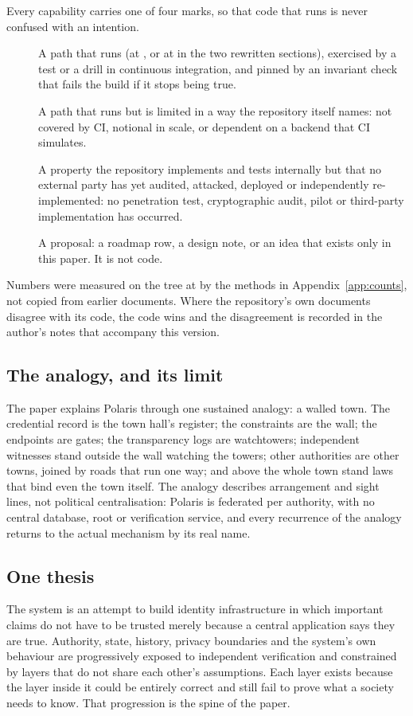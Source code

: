 Every capability carries one of four marks, so that code that runs is never confused with an
intention.

\begin{description}
  \item[\sImpl] A path that runs (at , or at  in the two rewritten
    sections), exercised by a test or a drill in continuous
    integration, and pinned by an invariant check that fails the build if it stops being true.
  \item[\sExp] A path that runs but is limited in a way the repository itself names: not covered by
    CI, notional in scale, or dependent on a backend that CI simulates.
  \item[\sExt] A property the repository implements and tests internally but that no external
    party has yet audited, attacked, deployed or independently re-implemented: no penetration
    test, cryptographic audit, pilot or third-party implementation has occurred.
  \item[\sFut] A proposal: a roadmap row, a design note, or an idea that exists only in this paper.
    It is not code.
\end{description}

Numbers were measured on the tree at  by the methods in Appendix~\ref{app:counts},
not copied from earlier documents. Where the repository's own documents disagree with its code, the
code wins and the disagreement is recorded in the author's notes that accompany this version.

\subsection*{The analogy, and its limit}

The paper explains Polaris through one sustained analogy: a walled town. The credential record is
the town hall's register; the constraints are the wall; the endpoints are gates; the transparency
logs are watchtowers; independent witnesses stand outside the wall watching the towers; other
authorities are other towns, joined by roads that run one way; and above the whole town stand laws
that bind even the town itself. The analogy describes arrangement and sight lines, not political
centralisation: Polaris is federated per authority, with no central database, root or verification
service, and every recurrence of the analogy returns to the actual mechanism by its real name.

\subsection*{One thesis}

The system is an attempt to build identity infrastructure in which important claims do not have to
be trusted merely because a central application says they are true. Authority, state, history,
privacy boundaries and the system's own behaviour are progressively exposed to independent
verification and constrained by layers that do not share each other's assumptions. Each layer exists
because the layer inside it could be entirely correct and still fail to prove what a society needs
to know. That progression is the spine of the paper.
